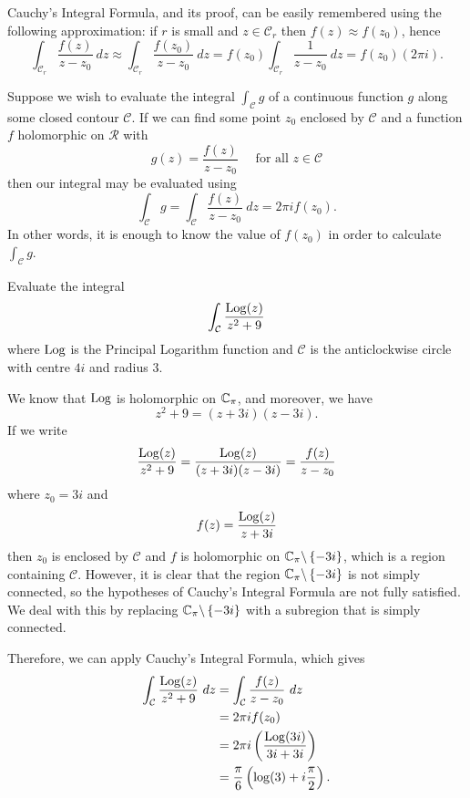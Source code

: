 \begin{note}
Cauchy's Integral Formula, and its proof, can be easily remembered using the following approximation: if $r$ is small and $z \in \mathcal{C}_r$ then $f(z) \approx f(z_0)$, hence
\[
\int_{\mathcal{C}_r} \frac{f(z)}{z-z_0}\ dz \approx \int_{\mathcal{C}_r} \frac{f(z_0)}{z-z_0}\ dz = f(z_0) \int_{\mathcal{C}_r} \frac{1}{z-z_0}\ dz = f(z_0) (2\pi i).
\]
\end{note}
Suppose we wish to evaluate the integral $\int_{\mathcal{C}} g$ of a continuous function $g$ along some closed contour $\mathcal{C}$.  If we can find some point $z_0$ enclosed by $\mathcal{C}$ and a function $f$ holomorphic on $\mathcal{R}$ with 
\[
g(z) = \frac{f(z)}{z-z_0} \quad \text{ for all }z \in \mathcal{C}
\]
then our integral may be evaluated using
\[
\int_{\mathcal{C}} g = \int_{\mathcal{C}} \frac{f(z)}{z-z_0}\ dz =  2\pi i f(z_0).
\]
In other words, it is enough to know the value of $f(z_0)$ in order to calculate $\int_{\mathcal{C}}g$.
\begin{example}
Evaluate the integral
\[
\int_{\mathcal{C}} \frac{\operatorname{Log} (z)}{z^2+9}
\]
where $\operatorname{Log}$ is the Principal Logarithm function and $\mathcal{C}$ is the anticlockwise circle with centre $4i$ and radius $3$.
\end{example}
\begin{solution}
We know that $\operatorname{Log}$ is holomorphic on $\mathbb{C}_{\pi}$, and moreover, we have
\[
z^2+9 = (z+3i)(z-3i).
\]
If we write
\[
\frac{\operatorname{Log} (z)}{z^2+9} = \frac{\operatorname{Log} (z)}{(z+3i)(z-3i)} = \frac{f(z)}{z-z_0}
\]
where $z_0=3i$ and
\[
f(z) = \frac{\operatorname{Log} (z)}{z+3i}
\]
then $z_0$ is enclosed by $\mathcal{C}$ and $f$ is holomorphic on $\mathbb{C}_{\pi} \backslash \left\{-3i\right\}$, which is a region containing $\mathcal{C}$.  However, it is clear that the region $\mathbb{C}_{\pi} \backslash \left\{-3i\right\}$ is not simply connected, so the hypotheses of Cauchy's Integral Formula are not fully satisfied.  We deal with this by replacing $\mathbb{C}_{\pi} \backslash \left\{-3i\right\}$ with a subregion that is simply connected.





Therefore, we can apply Cauchy's Integral Formula, which gives
\begin{align*}
\int_{\mathcal{C}} \frac{\operatorname{Log}(z)}{z^2+9}\ dz &= \int_{\mathcal{C}} \frac{f(z)}{z-z_0}\ dz \\
& = 2 \pi i f(z_0) \\
& = 2 \pi i \left( \frac{\operatorname{Log}(3i)}{3i+3i} \right) \\
& = \frac{\pi}{6} \left( \log (3) + i \frac{\pi}{2} \right).
\end{align*}
\end{solution}
